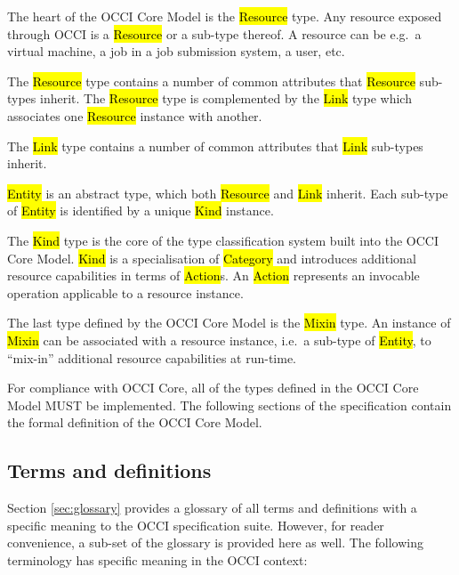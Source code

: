 \documentclass[10pt,a4paper]{article}
\begin{document}
The heart of the OCCI Core Model is the \hl{Resource} type. Any
resource exposed through OCCI is a \hl{Resource} or a sub-type
thereof.  A resource can be e.g.~a virtual machine, a job in a job
submission system, a user, etc.

The \hl{Resource} type contains a number of common attributes that
\hl{Resource} sub-types inherit. The \hl{Resource} type is
complemented by the \hl{Link} type which associates one \hl{Resource}
instance with another.

The \hl{Link} type contains a number of common attributes that
\hl{Link} sub-types inherit.

\hl{Entity} is an abstract type, which both \hl{Resource} and \hl{Link}
inherit.  Each sub-type of \hl{Entity} is identified by a unique
\hl{Kind} instance.

The \hl{Kind} type is the core of the type classification system built
into the OCCI Core Model. \hl{Kind} is a specialisation of
\hl{Category} and introduces additional resource capabilities in terms
of \hl{Action}s.  An \hl{Action} represents an invocable operation
applicable to a resource instance.

The last type defined by the OCCI Core Model is the \hl{Mixin}
type. An instance of \hl{Mixin} can be associated with a resource
instance, i.e.~a sub-type of \hl{Entity}, to ``mix-in'' additional
resource capabilities at run-time.

For compliance with OCCI Core, all of the types defined in the OCCI
Core Model MUST be implemented.  The following sections of the
specification contain the formal definition of the OCCI Core Model.

\subsection{Terms and definitions}
Section \ref{sec:glossary} provides a glossary of all terms and
definitions with a specific meaning to the OCCI specification
suite. However, for reader convenience, a sub-set of the glossary is
provided here as well. The following terminology has specific meaning
in the OCCI context:
\end{document}
